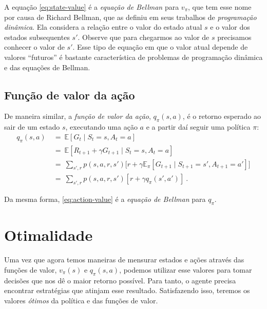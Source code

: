 \documentclass{article}
\begin{document}
            A equação \eqref{eq:state-value} é a \emph{equação de Bellman} para $v_{\pi}$, que tem esse nome por causa de Richard Bellman, que as definiu em seus trabalhos de \emph{programação dinâmica}. Ela considera a relação entre o valor do estado atual $s$ e o valor dos estados subsequentes $s'$. Observe que para chegarmos ao valor de $s$ precisamos conhecer o valor de $s'$. Esse tipo de equação em que o valor atual depende de valores ``futuros'' é bastante característica de problemas de programação dinâmica e das equações de Bellman.
        
        \subsection{Função de valor da ação}
        
            De maneira similar, a \emph{função de valor da ação}, $q_{\pi}(s, a)$, é o retorno esperado ao sair de um estado $s$, executando uma ação $a$ e a partir daí seguir uma política $\pi$:
            \begin{equation}
            \label{eq:action-value}
            \begin{split}
                q_{\pi}(s, a) & \ = \ \mathbb{E}[G_t \mid S_t = s, A_t = a] \\
                & \ = \ \mathbb{E}[R_{t+1} + \gamma G_{t+1} \mid S_t = s, A_t = a] \\
                & \ = \ \sum_{s',r} p(s, a, r, s') \Big[r + \gamma \mathbb{E}_{\pi}[ G_{t+1} \mid S_{t+1} = s', A_{t+1} = a'] \Big]\\
                & \ = \ \sum_{s',r} p(s, a, r, s') [r + \gamma q_{\pi}(s', a')]\ .
            \end{split}
            \end{equation}

            Da mesma forma, \eqref{eq:action-value} é a \emph{equação de Bellman} para $q_{\pi}$.
        
    \section{Otimalidade}
    
        Uma vez que agora temos maneiras de mensurar estados e ações através das funções de valor, $v_{\pi}(s)$ e $q_{\pi}(s, a)$, podemos utilizar esse valores para tomar decisões que nos dê o maior retorno possível. Para tanto, o agente precisa encontrar estratégias que atinjam esse resultado. Satisfazendo isso, teremos os valores \emph{ótimos} da política e das funções de valor.
\end{document}
